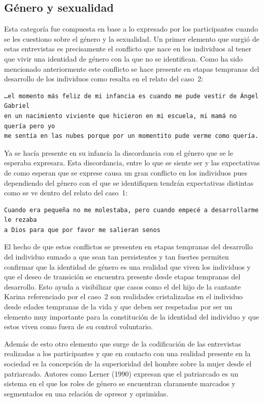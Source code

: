 \subsection{Género y sexualidad}

Esta categoría fue compuesta en base a lo expresado por los participantes
cuando se les cuestiono sobre el género y la sexualidad. Un primer elemento que
surgió de estas entrevistas es precisamente el conflicto que nace en los
individuos al tener que vivir una identidad de género con la que no se
identifican. Como ha sido mencionado anteriormente este conflicto se hace
presente en etapas tempranas del desarrollo de los individuos como resalta en el
relato del caso~2:

\begin{verbatim}
…el momento más feliz de mi infancia es cuando me pude vestir de Ángel Gabriel
en un nacimiento viviente que hicieron en mi escuela, mi mamá no quería pero yo
me sentía en las nubes porque por un momentito pude verme como quería.
\end{verbatim}

Ya se hacía presente en su infancia la discordancia con el género que se le
esperaba expresara. Esta discordancia, entre lo que se siente ser y las
expectativas de como esperan que se exprese causa un gran conflicto en los
individuos pues dependiendo del género con el que se identifiquen tendrán
expectativas distintas como se ve dentro del relato del caso~1:

\begin{verbatim}
Cuando era pequeña no me molestaba, pero cuando empecé a desarrollarme le rezaba
a Dios para que por favor me salieran senos
\end{verbatim}

El hecho de que estos conflictos se presenten en etapas tempranas del desarrollo
del individuo sumado a que sean tan persistentes y tan fuertes permiten
confirmar que la identidad de género es una realidad que viven los individuos y
que el deseo de transición se encuentra presente desde etapas tempranas del
desarrollo. Esto ayuda a visibilizar que casos como el del hijo de la cantante
Karina referenciado por el caso~2 son realidades cristalizadas en el individuo
desde edades tempranas de la vida y que deben ser respetadas por ser un elemento
muy importante para la constitución de la identidad del individuo y que estos
viven como fuera de su control voluntario.

Además de esto otro elemento que surge de la codificación de las entrevistas
realizadas a los participantes y que en contacto con una realidad presente en la
sociedad es la concepción de la superioridad del hombre sobre la mujer desde el
patriarcado. Autores como Lerner (1990) expresan que el patriarcado es un
sistema en el que los roles de género se encuentran claramente marcados y
segmentados en una relación de opresor y oprimidas.

